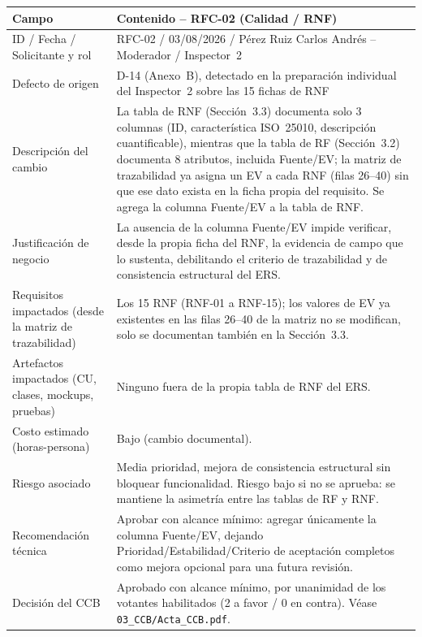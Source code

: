 \documentclass[11pt,a4paper]{article}
\begin{document}
\begin{longtable}{|p{4.5cm}|p{9.5cm}|}
\hline
\textbf{Campo} & \textbf{Contenido -- RFC-02 (Calidad / RNF)} \\
\hline
ID / Fecha / Solicitante y rol & RFC-02 / 03/08/2026 / Pérez Ruiz Carlos Andrés -- Moderador / Inspector~2 \\
\hline
Defecto de origen & D-14 (Anexo~B), detectado en la preparación individual del Inspector~2 sobre las 15 fichas de RNF \\
\hline
Descripción del cambio & La tabla de RNF (Sección~3.3) documenta solo 3 columnas (ID, característica ISO~25010, descripción cuantificable), mientras que la tabla de RF (Sección~3.2) documenta 8 atributos, incluida Fuente/EV; la matriz de trazabilidad ya asigna un EV a cada RNF (filas 26--40) sin que ese dato exista en la ficha propia del requisito. Se agrega la columna Fuente/EV a la tabla de RNF. \\
\hline
Justificación de negocio & La ausencia de la columna Fuente/EV impide verificar, desde la propia ficha del RNF, la evidencia de campo que lo sustenta, debilitando el criterio de trazabilidad y de consistencia estructural del ERS. \\
\hline
Requisitos impactados (desde la matriz de trazabilidad) & Los 15 RNF (RNF-01 a RNF-15); los valores de EV ya existentes en las filas 26--40 de la matriz no se modifican, solo se documentan también en la Sección~3.3. \\
\hline
Artefactos impactados (CU, clases, mockups, pruebas) & Ninguno fuera de la propia tabla de RNF del ERS. \\
\hline
Costo estimado (horas-persona) & Bajo (cambio documental). \\
\hline
Riesgo asociado & Media prioridad, mejora de consistencia estructural sin bloquear funcionalidad. Riesgo bajo si no se aprueba: se mantiene la asimetría entre las tablas de RF y RNF. \\
\hline
Recomendación técnica & Aprobar con alcance mínimo: agregar únicamente la columna Fuente/EV, dejando Prioridad/Estabilidad/Criterio de aceptación completos como mejora opcional para una futura revisión. \\
\hline
Decisión del CCB & Aprobado con alcance mínimo, por unanimidad de los votantes habilitados (2 a favor / 0 en contra). Véase \texttt{03\_CCB/Acta\_CCB.pdf}. \\
\hline
\end{longtable}
\end{document}
